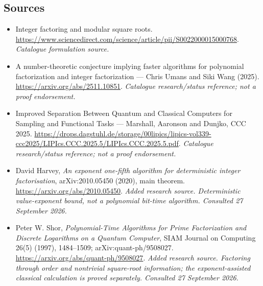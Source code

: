 \documentclass[11pt,a4paper]{article}
\begin{document}
\subsection{Sources}
\begin{itemize}\raggedright
\item[\textnormal{[S1]}]\hypertarget{source:statement:1}{} Integer factoring and modular square roots.
\url{https://www.sciencedirect.com/science/article/pii/S0022000015000768}.
{\small\textit{Catalogue formulation source.}}
\item[\textnormal{[S2]}]\hypertarget{source:statement:2}{} A number-theoretic conjecture implying faster algorithms for polynomial factorization and integer factorization — Chris Umans and Siki Wang (2025).
\url{https://arxiv.org/abs/2511.10851}.
{\small\textit{Catalogue research/status reference; not a proof endorsement.}}
\item[\textnormal{[S3]}]\hypertarget{source:statement:3}{} Improved Separation Between Quantum and Classical Computers for Sampling and Functional Tasks — Marshall, Aaronson and Dunjko, CCC 2025.
\url{https://drops.dagstuhl.de/storage/00lipics/lipics-vol339-ccc2025/LIPIcs.CCC.2025.5/LIPIcs.CCC.2025.5.pdf}.
{\small\textit{Catalogue research/status reference; not a proof endorsement.}}
\item[\textnormal{[E1]}]\hypertarget{extra:statement:1}{} David Harvey, \emph{An exponent one-fifth algorithm for deterministic integer factorisation}, arXiv:2010.05450 (2020), main theorem.
\url{https://arxiv.org/abs/2010.05450}.
{\small\textit{Added research source. Deterministic value-exponent bound, not a polynomial bit-time algorithm. Consulted 27 September 2026.}}
\item[\textnormal{[E2]}]\hypertarget{extra:statement:2}{} Peter W. Shor, \emph{Polynomial-Time Algorithms for Prime Factorization and Discrete Logarithms on a Quantum Computer}, SIAM Journal on Computing 26(5) (1997), 1484--1509; arXiv:quant-ph/9508027.
\url{https://arxiv.org/abs/quant-ph/9508027}.
{\small\textit{Added research source. Factoring through order and nontrivial square-root information; the exponent-assisted classical calculation is proved separately. Consulted 27 September 2026.}}
\end{itemize}

\end{document}
